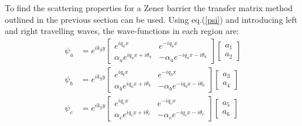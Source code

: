 \documentclass[prl,twocolumn,aps,superscriptaddress,floatfix,10pt]{revtex4}
\begin{document}
	To find the scattering properties for a Zener barrier the transfer matrix method \cite{b18} outlined in the previous section can be used. Using eq.(\ref{psi}) and introducing left and right travelling waves, the wave-functions in each region are:
\begin{align}
	\psi_{a}&=e^{ik_{y}y}
	\left[\begin{array}{ccc}
		e^{iq_{a}x}&e^{-iq_{a}x}\\
		\alpha_{a}e^{iq_{a}x+i\theta_{a}}&-\alpha_{a}e^{-iq_{a}x-i\theta_{a}}
	\end{array}\right]
	\left[\begin{array}{ccc}
		a_{1}\\
		a_{2}
	\end{array}\right]\\
	\psi_{b}&=e^{ik_{y}y}
	\left[\begin{array}{ccc}
		e^{iq_{b}x}&e^{-iq_{b}x}\\
		\alpha_{b}e^{iq_{a}x+i\theta_{b}}&-\alpha_{b}e^{-iq_{b}x-i\theta_{b}}
	\end{array}\right]
	\left[\begin{array}{ccc}
		a_{3}\\
		a_{4}
	\end{array}\right]\\
	\psi_{c}&=e^{ik_{y}y}
	\left[\begin{array}{ccc}
		e^{iq_{c}x}&e^{-iq_{c}x}\\
		\alpha_{c}e^{iq_{c}x+i\theta_{c}}&-\alpha_{c}e^{-iq_{c}x-i\theta_{c}}
	\end{array}\right]
	\left[\begin{array}{ccc}
		a_{5}\\
		a_{6}
	\end{array}\right]
\end{align}
\end{document}
